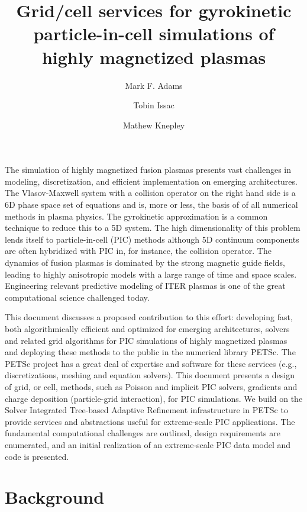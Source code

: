 \documentclass[review]{siamart}
\title{Grid/cell services for gyrokinetic particle-in-cell simulations of highly magnetized plasmas}
\author{Mark F. Adams \and Tobin Issac \and Mathew Knepley}
\begin{document}
\maketitle

The simulation of highly magnetized fusion plasmas presents vast challenges in modeling, discretization, and efficient implementation on emerging architectures.
The Vlasov-Maxwell system with a collision operator on the right hand side is a 6D phase space set of equations and is, more or less, the basis of of all numerical methods in plasma physics.
The gyrokinetic approximation is a common technique to reduce this to a 5D system.
The high dimensionality of this problem lends itself to particle-in-cell (PIC) methods although 5D continuum components are often hybridized with PIC in, for instance, the collision operator.
The dynamics of fusion plasmas is dominated by the strong magnetic guide fields, leading to highly anisotropic models with a large range of time and space scales.
Engineering relevant predictive modeling of ITER plasmas is one of the great computational science challenged today.

This document discusses a proposed contribution to this effort: developing fast, both algorithmically efficient and optimized for emerging architectures, solvers and related grid algorithms for PIC simulations of highly magnetized plasmas and deploying these methods to the public in the numerical library PETSc.
The PETSc project has a great deal of expertise and software for these services (e.g., discretizations, meshing and equation solvers).
This document presents a design of grid, or cell, methods, such as Poisson and implicit PIC solvers, gradients and charge deposition (particle-grid interaction), for PIC simulations.
We build on the Solver Integrated Tree-based Adaptive Refinement infrastructure in PETSc to provide services and abstractions useful for extreme-scale PIC applications.
The fundamental computational challenges are outlined, design requirements are enumerated, and an initial realization of an extreme-scale PIC data model and code is presented.

\section{Background}
\end{document}
